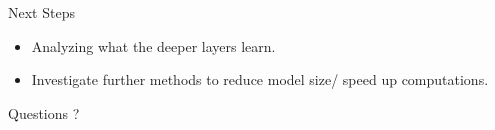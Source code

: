 \documentclass{beamer}
\begin{document}
\begin{darkframes}
    \begin{frame}{Next Steps}
    	\begin{itemize}
    		\item Analyzing what the deeper layers learn.
    		\item Investigate further methods to reduce model size/ speed up computations.
    	\end{itemize}
    \end{frame}
    

    \begin{frame}{Questions}
    \centering
\huge ?
    	\end{frame}
    
    
  \end{darkframes}
\end{document}
